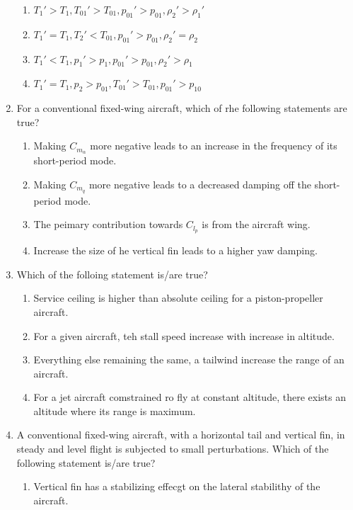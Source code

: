 \documentclass[journal]{IEEEtran}
\begin{document}
\begin{enumerate}
\begin{figure}[ht!]
	\end{figure}  
		\begin{enumerate}
             \item $T_1'>T_1,T_{01}'>T_{01},p_{01}'>p_{01},\rho_2'>\rho_1'$
             \item $T_1'=T_1,T_{2}'<T_{01},p_{01}'>p_{01},\rho_2'=\rho_2$
             \item $T_1'<T_1,p_{1}'>p_{1},p_{01}'>p_{01},\rho_2'>\rho_1$
             \item $T_1'=T_1,p_{2}>p_{01},T_{01}'>T_{01},p_{01}'>p_{10}$
         \end{enumerate}
	\item For a conventional fixed-wing aircraft, which of rhe following statements are true?
          \begin{enumerate}
              \item Making $C_{m_\alpha}$ more negative leads to an increase in the frequency of its short-period mode.
              \item Making $C_{m_q}$ more negative leads to a decreased damping off the short-period mode.
              \item The peimary contribution towards $C_{l_p}$ is from the aircraft wing.
              \item  Increase the size of he vertical fin leads to a higher yaw damping.
          \end{enumerate}
	\item Which of the folloing statement is/are true?
         \begin{enumerate}
             \item Service ceiling is higher than absolute ceiling for a piston-propeller aircraft.
             \item For a given aircraft, teh stall speed increase with increase in altitude.
             \item Everything else remaining the same, a tailwind increase the range of an aircraft.
             \item For a jet aircraft comstrained ro fly at constant altitude, there exists an altitude where its range is maximum.
         \end{enumerate}
	\item A conventional fixed-wing aircraft, with a horizontal tail and vertical fin, in steady and level flight is subjected to small perturbations. Which of the following statement is/are true?
          \begin{enumerate}
              \item Vertical fin has a stabilizing effecgt on the lateral stabilithy of the aircraft.

\end{enumerate}
\end{enumerate}
\end{document}
